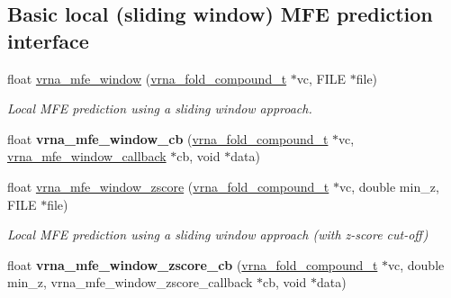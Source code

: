 \subsection*{Basic local (sliding window) M\+FE prediction interface}
\begin{DoxyCompactItemize}
\item 
float \mbox{\hyperlink{group__mfe__window_ga689df235a1915a1ad56e377383c044ce}{vrna\+\_\+mfe\+\_\+window}} (\mbox{\hyperlink{group__fold__compound_ga1b0cef17fd40466cef5968eaeeff6166}{vrna\+\_\+fold\+\_\+compound\+\_\+t}} $\ast$vc, F\+I\+LE $\ast$file)
\begin{DoxyCompactList}\small\item\em Local M\+FE prediction using a sliding window approach. \end{DoxyCompactList}\item 
\mbox{\label{group__mfe__window_gad4995894b294ddb8550af444a0decbd1}} 
float {\bfseries vrna\+\_\+mfe\+\_\+window\+\_\+cb} (\mbox{\hyperlink{group__fold__compound_ga1b0cef17fd40466cef5968eaeeff6166}{vrna\+\_\+fold\+\_\+compound\+\_\+t}} $\ast$vc, \mbox{\hyperlink{group__mfe__window_ga4f3e5bc214ef803074ace313cb9571b4}{vrna\+\_\+mfe\+\_\+window\+\_\+callback}} $\ast$cb, void $\ast$data)
\item 
float \mbox{\hyperlink{group__mfe__window_gaa4f67ae94efd08d800c17f9b53423fd6}{vrna\+\_\+mfe\+\_\+window\+\_\+zscore}} (\mbox{\hyperlink{group__fold__compound_ga1b0cef17fd40466cef5968eaeeff6166}{vrna\+\_\+fold\+\_\+compound\+\_\+t}} $\ast$vc, double min\+\_\+z, F\+I\+LE $\ast$file)
\begin{DoxyCompactList}\small\item\em Local M\+FE prediction using a sliding window approach (with z-\/score cut-\/off) \end{DoxyCompactList}\item 
\mbox{\label{group__mfe__window_ga2762be816af3dbc18c256e44c1345e4f}} 
float {\bfseries vrna\+\_\+mfe\+\_\+window\+\_\+zscore\+\_\+cb} (\mbox{\hyperlink{group__fold__compound_ga1b0cef17fd40466cef5968eaeeff6166}{vrna\+\_\+fold\+\_\+compound\+\_\+t}} $\ast$vc, double min\+\_\+z, vrna\+\_\+mfe\+\_\+window\+\_\+zscore\+\_\+callback $\ast$cb, void $\ast$data)
\end{DoxyCompactItemize}

